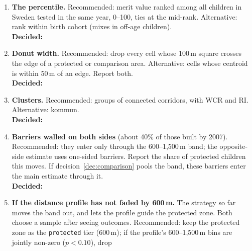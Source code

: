 \documentclass[11pt]{article}
\begin{document}
\begin{enumerate}
  Recommended:
  \begin{itemize}
  \item \textbf{short window \(K = 5\)} (\(e = -5, \dots, 3\)): three placebo cohorts beyond the
    reference, for few walls lost;
  \item \textbf{full window \(K = 4\), \(L = 1\)} (\(e = -4, \dots, 17\)): two placebo cohorts
    and the in-utero step. \(K = 3\) leaves a single placebo cohort (\(e = -3\)), and \(K = 5\)
    loses a third of the rail walls;
  \item \textbf{no plateau as a target}: \(L = 4\) keeps 25 road records. The full window is
    mostly a rail result unless Trafikverket recovers years for the road walls loaded in 2006:
    4 usable road stacks today, about 46 with the missing years, at most 164
    (\S\ref{sec:power}).
  \end{itemize}
  \textbf{Decided:}
\item \textbf{The percentile.} Recommended: merit value ranked among all children in Sweden
  tested in the same year, 0--100, ties at the mid-rank. Alternative: rank within birth cohort
  (mixes in off-age children).\\ \textbf{Decided:}
\item \textbf{Donut width.} Recommended: drop every cell whose 100\,m square crosses the edge
  of a protected or comparison area. Alternative: cells whose centroid is within 50\,m of an
  edge. Report both.\\ \textbf{Decided:}
\item \textbf{Clusters.} Recommended: groups of connected corridors, with WCR and RI.
  Alternative: kommun.\\ \textbf{Decided:}
\item \textbf{Barriers walled on both sides} (about 40\% of those built by 2007). Recommended:
  they enter only through the 600--1,500\,m band; the opposite-side estimate uses one-sided
  barriers. Report the share of protected children this moves. If decision~\ref{dec:comparison}
  pools the band, these barriers enter the main estimate through it.\\ \textbf{Decided:}
\item\label{dec:profile} \textbf{If the distance profile has not faded by 600\,m.} The strategy
  so far moves the band out, and lets the profile guide the protected zone. Both choose a sample
  after seeing outcomes. Recommended: keep the protected zone as the \texttt{protected} tier
  (600\,m); if the profile's 600--1,500\,m bins are jointly non-zero (\(p < 0.10\)), drop

\end{enumerate}
\end{document}
